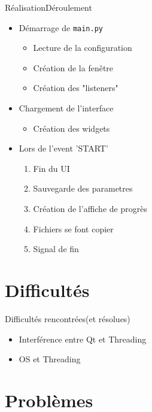 \documentclass{beamer}
\begin{document}
	\begin{frame}{Réalisation}{Déroulement}
	  \begin{itemize}
			\item Démarrage de \texttt{main.py}
			\begin{itemize}
				\item Lecture de la configuration
				\item Création de la fenêtre
				\item Création des "listeners"
			\end{itemize}
			\item Chargement de l'interface
			\begin{itemize}
				\item Création des widgets
			\end{itemize}
			\item Lors de l'event 'START'
			\begin{enumerate}
				\item Fin du UI
				\item Sauvegarde des parametres
				\item Création de l'affiche de progrès
				\item Fichiers se font copier
				\item Signal de fin
			\end{enumerate}
	  \end{itemize}
	\end{frame}

	\section{Difficultés}

	\begin{frame}{Difficultés rencontrées}{(et résolues)}
	  \begin{itemize}
			\item Interférence entre Qt et Threading
			\item OS et Threading

	  \end{itemize}
	\end{frame}

	\section{Problèmes}
\end{document}
